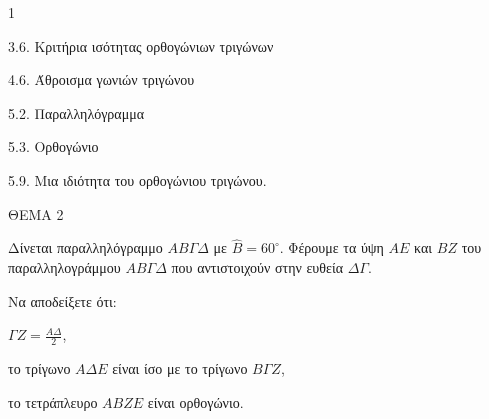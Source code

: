 \begin{ylh}{1}
    \item 3.6. Κριτήρια ισότητας ορθογώνιων τριγώνων
    \item 4.6. Άθροισμα γωνιών τριγώνου
    \item 5.2. Παραλληλόγραμμα
    \item 5.3. Ορθογώνιο
    \item 5.9. Μια ιδιότητα του ορθογώνιου τριγώνου.
\end{ylh}

ΘΕΜΑ 2

Δίνεται παραλληλόγραμμο $ΑΒ\Gamma\Delta$ με $\widehat{Β} = 60^{\circ}$. Φέρουμε τα ύψη $ΑΕ$ και $BZ$ του παραλληλογράμμου $ΑΒ\Gamma\Delta$ που αντιστοιχούν στην ευθεία $\Delta\Gamma$.

Να αποδείξετε ότι:

\begin{alist}
\item $\Gamma Z = \frac{A\Delta}{2}$, 
\item το τρίγωνο $A\Delta E$ είναι ίσο με το τρίγωνο $B\Gamma Z$, 
\item το τετράπλευρο $ABZE$ είναι ορθογώνιο. 

\begin{center}
\end{center}
\end{alist}
